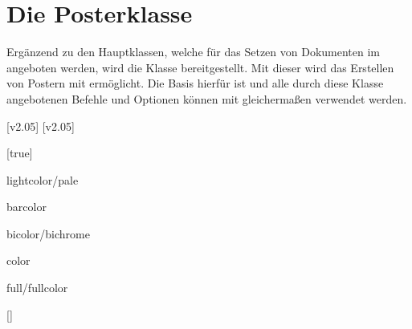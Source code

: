 \chapter[Die Klasse tudscrposter]{Die Posterklasse}
\label{sec:poster}%
%
\begin{Bundle!}[v2.05]{}
%
\printchangedatlist%
%
Ergänzend zu den Hauptklassen, welche für das Setzen von Dokumenten im \TUDCD 
angeboten werden, wird die Klasse  bereitgestellt. Mit 
dieser wird das Erstellen von Postern mit  ermöglicht. Die Basis 
hierfür ist  und alle durch diese Klasse angebotenen Befehle 
und Optionen können mit  gleichermaßen verwendet werden.

[v2.05]
[v2.05]

\begin{Declaration}[v2.05]{}[true]
\printdeclarationlist%
\begin{values}{}
\itemfalse
{}
\item[lightcolor/pale]
\item[barcolor]
\item[bicolor/bichrome]
\item[color]
\item[full/fullcolor]
\end{values}
\end{Declaration}



\begin{Declaration}[v2.05]{[]}
\printdeclarationlist%
\end{Declaration}


\end{Bundle!}
